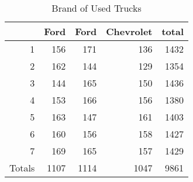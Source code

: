 \begin{table}[ht]
\centering
\begin{tabular}{rrrrr}
  \hline
 & Ford & Ford & Chevrolet & total \\ 
  \hline
1 & 156 & 171 & 136 & 1432 \\ 
  2 & 162 & 144 & 129 & 1354 \\ 
  3 & 144 & 165 & 150 & 1436 \\ 
  4 & 153 & 166 & 156 & 1380 \\ 
  5 & 163 & 147 & 161 & 1403 \\ 
  6 & 160 & 156 & 158 & 1427 \\ 
  7 & 169 & 165 & 157 & 1429 \\ 
  Totals & 1107 & 1114 & 1047 & 9861 \\ 
   \hline
\end{tabular}
\caption{Brand of Used Trucks} 
\label{tab:Truck_brand}
\end{table}
